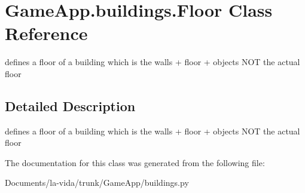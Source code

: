 \hypertarget{classGameApp_1_1buildings_1_1Floor}{
\section{GameApp.buildings.Floor Class Reference}
\label{classGameApp_1_1buildings_1_1Floor}
}
defines a floor of a building which is the walls + floor + objects NOT the actual floor  




\subsection{Detailed Description}
defines a floor of a building which is the walls + floor + objects NOT the actual floor 

The documentation for this class was generated from the following file:\begin{CompactItemize}
\item 
Documents/la-vida/trunk/GameApp/buildings.py\end{CompactItemize}
